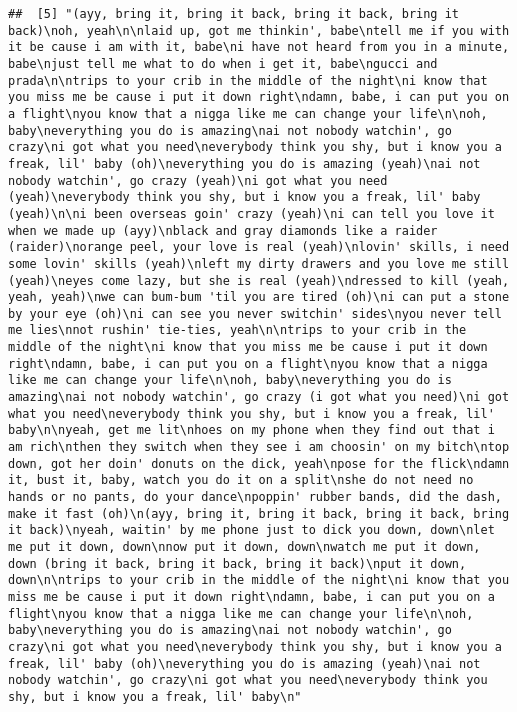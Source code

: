 \documentclass[]{article}
\begin{document}
\begin{verbatim}
##  [5] "(ayy, bring it, bring it back, bring it back, bring it back)\noh, yeah\n\nlaid up, got me thinkin', babe\ntell me if you with it be cause i am with it, babe\ni have not heard from you in a minute, babe\njust tell me what to do when i get it, babe\ngucci and prada\n\ntrips to your crib in the middle of the night\ni know that you miss me be cause i put it down right\ndamn, babe, i can put you on a flight\nyou know that a nigga like me can change your life\n\noh, baby\neverything you do is amazing\nai not nobody watchin', go crazy\ni got what you need\neverybody think you shy, but i know you a freak, lil' baby (oh)\neverything you do is amazing (yeah)\nai not nobody watchin', go crazy (yeah)\ni got what you need (yeah)\neverybody think you shy, but i know you a freak, lil' baby (yeah)\n\ni been overseas goin' crazy (yeah)\ni can tell you love it when we made up (ayy)\nblack and gray diamonds like a raider (raider)\norange peel, your love is real (yeah)\nlovin' skills, i need some lovin' skills (yeah)\nleft my dirty drawers and you love me still (yeah)\neyes come lazy, but she is real (yeah)\ndressed to kill (yeah, yeah, yeah)\nwe can bum-bum 'til you are tired (oh)\ni can put a stone by your eye (oh)\ni can see you never switchin' sides\nyou never tell me lies\nnot rushin' tie-ties, yeah\n\ntrips to your crib in the middle of the night\ni know that you miss me be cause i put it down right\ndamn, babe, i can put you on a flight\nyou know that a nigga like me can change your life\n\noh, baby\neverything you do is amazing\nai not nobody watchin', go crazy (i got what you need)\ni got what you need\neverybody think you shy, but i know you a freak, lil' baby\n\nyeah, get me lit\nhoes on my phone when they find out that i am rich\nthen they switch when they see i am choosin' on my bitch\ntop down, got her doin' donuts on the dick, yeah\npose for the flick\ndamn it, bust it, baby, watch you do it on a split\nshe do not need no hands or no pants, do your dance\npoppin' rubber bands, did the dash, make it fast (oh)\n(ayy, bring it, bring it back, bring it back, bring it back)\nyeah, waitin' by me phone just to dick you down, down\nlet me put it down, down\nnow put it down, down\nwatch me put it down, down (bring it back, bring it back, bring it back)\nput it down, down\n\ntrips to your crib in the middle of the night\ni know that you miss me be cause i put it down right\ndamn, babe, i can put you on a flight\nyou know that a nigga like me can change your life\n\noh, baby\neverything you do is amazing\nai not nobody watchin', go crazy\ni got what you need\neverybody think you shy, but i know you a freak, lil' baby (oh)\neverything you do is amazing (yeah)\nai not nobody watchin', go crazy\ni got what you need\neverybody think you shy, but i know you a freak, lil' baby\n"                                                                                                                                                                                                                                                                                                                                                                                                                                                                                                                      
\end{verbatim}
\end{document}

